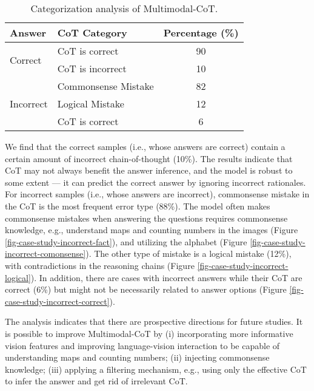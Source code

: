 \documentclass[nohyperref]{article}
\theoremstyle{plain}
\theoremstyle{definition}
\theoremstyle{remark}
\begin{document}
\begin{table}[h]
    \centering\small
\vspace{-3mm}
    \caption{Categorization analysis of Multimodal-CoT.}
    \label{tab:analysis_error}
    \begin{tabular}{llc}\toprule
    Answer & CoT Category & Percentage (\%) \\
    \midrule 
    \multirow{2}{*}{Correct} &CoT is correct & 90 \\
    &CoT is incorrect & 10\\
    \midrule
    \multirow{3}{*}{Incorrect} 
    & Commonsense Mistake & 82  \\
& Logical Mistake & 12 \\
    & CoT is correct & 6 \\
    \bottomrule
\end{tabular}
\end{table}

We find that the correct samples {(i.e., whose answers are correct)} contain a certain amount of incorrect chain-of-thought (10\%). The results indicate that CoT may not always benefit the answer inference, and the model is robust to some extent --- it can predict the correct answer by ignoring incorrect rationales. For incorrect samples {(i.e., whose answers are incorrect), commonsense mistake in the CoT} is the most frequent error type (88\%). The model often makes commonsense mistakes when answering the questions requires commonsense knowledge, e.g., understand maps and counting numbers in the images (Figure \ref{fig-case-study-incorrect-fact}), and utilizing the alphabet (Figure \ref{fig-case-study-incorrect-comonsense}). The other type of mistake is a logical mistake (12\%), with contradictions in the reasoning chains  (Figure \ref{fig-case-study-incorrect-logical}). In addition, there are cases with incorrect answers while their CoT are correct (6\%) but might not be necessarily related to answer options (Figure \ref{fig-case-study-incorrect-correct}).

The analysis indicates that there are prospective directions for future studies. It is possible to improve Multimodal-CoT by (i) incorporating more informative vision features and improving language-vision interaction to be capable of understanding maps and counting numbers; (ii) injecting commonsense knowledge; (iii) applying a filtering mechanism, e.g., using only the effective CoT to infer the answer and get rid of irrelevant CoT.
\end{document}
